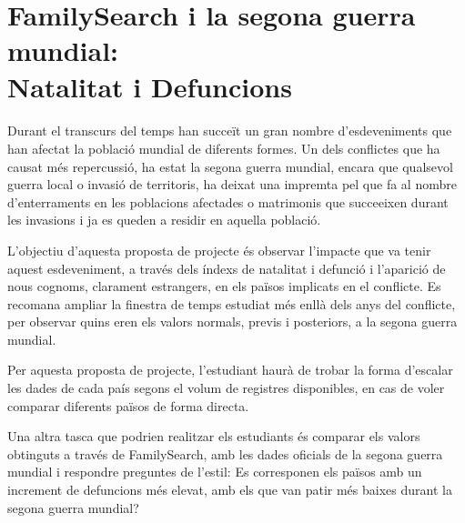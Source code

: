 \section{FamilySearch i la segona guerra mundial:\\Natalitat i Defuncions}

    \paragraph{}
    Durant el transcurs del temps han succeït un gran nombre d'esdeveniments que han afectat la població mundial de diferents formes. Un dels conflictes que ha causat més repercussió, ha estat la segona guerra mundial, encara que qualsevol guerra local o invasió de territoris, ha deixat una impremta pel que fa al nombre d'enterraments en les poblacions afectades o matrimonis que succeeixen durant les invasions i ja es queden a residir en aquella població.

    L'objectiu d'aquesta proposta de projecte és observar l'impacte que va tenir aquest esdeveniment, a través dels índexs de natalitat i defunció i l'aparició de nous cognoms, clarament estrangers, en els països implicats en el conflicte. Es recomana ampliar la finestra de temps estudiat més enllà dels anys del conflicte, per observar quins eren els valors normals, previs i posteriors, a la segona guerra mundial.

    Per aquesta proposta de projecte, l'estudiant haurà de trobar la forma d'escalar les dades de cada país segons el volum de registres disponibles, en cas de voler comparar diferents països de forma directa.

    Una altra tasca que podrien realitzar els estudiants és comparar els valors ob\-tin\-guts a través de FamilySearch, amb les dades oficials de la segona guerra mundial i respon\-dre preguntes de l'estil: Es corresponen els països amb un increment de defuncions més elevat, amb els que van patir més baixes durant la segona guerra mundial?

